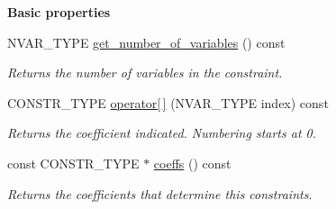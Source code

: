 \begin{Indent}\textbf{ Basic properties}\par
\begin{DoxyCompactItemize}
\item 
\mbox{\label{group___c_l_s_solvers_a10b3789ede36e0b614fb76fbe0248476}} 
N\+V\+A\+R\+\_\+\+T\+Y\+PE \hyperlink{group___c_l_s_solvers_a10b3789ede36e0b614fb76fbe0248476}{get\+\_\+number\+\_\+of\+\_\+variables} () const
\begin{DoxyCompactList}\small\item\em Returns the number of variables in the constraint. \end{DoxyCompactList}\item 
\mbox{\label{group___c_l_s_solvers_a286fb7825aa45114478110e17bef1ccc}} 
C\+O\+N\+S\+T\+R\+\_\+\+T\+Y\+PE \hyperlink{group___c_l_s_solvers_a286fb7825aa45114478110e17bef1ccc}{operator\mbox{[}$\,$\mbox{]}} (N\+V\+A\+R\+\_\+\+T\+Y\+PE index) const
\begin{DoxyCompactList}\small\item\em Returns the coefficient indicated. Numbering starts at 0. \end{DoxyCompactList}\item 
\mbox{\label{group___c_l_s_solvers_a4e6dd23c317ce6865167b30d1d75de19}} 
const C\+O\+N\+S\+T\+R\+\_\+\+T\+Y\+PE $\ast$ \hyperlink{group___c_l_s_solvers_a4e6dd23c317ce6865167b30d1d75de19}{coeffs} () const
\begin{DoxyCompactList}\small\item\em Returns the coefficients that determine this constraints. \end{DoxyCompactList}\end{DoxyCompactItemize}
\end{Indent}
